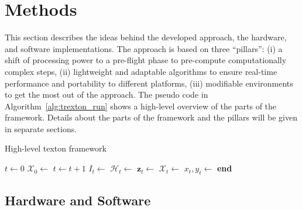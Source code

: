 \documentclass[11pt]{report}
\begin{document}
\chapter{Methods}
\label{chap:methods}

This section describes the ideas behind the developed approach, the
hardware, and software implementations.
The approach is based on three ``pillars'': (i) a shift of processing
power to a pre-flight phase to pre-compute computationally complex
steps, (ii) lightweight and adaptable algorithms to ensure real-time
performance and portability to different platforms, (iii) modifiable
environments to get the most out of the approach. The pseudo code in
Algorithm~\ref{alg:trexton_run} shows a high-level overview of the
parts of the framework. Details about the parts of the framework and
the pillars will be given in separate sections.
\begin{algorithm}
    \caption{High-level texton framework}
    \label{alg:trexton_run}
    \begin{algorithmic}[1]
      \State $t \gets 0$
      \State $\mathcal{X}_0 \gets$ 
      \State $t \gets t+1$ \State
      $I_t \gets$  \State
      $\mathcal{H}_t \gets$ 
      \State $\mathbf{z}_t \gets$
      \State $\mathcal{X}_t \gets$
      \State $x_t, y_t \gets$ 
      \EndWhile
\State \textbf{end}
    \end{algorithmic}
  \end{algorithm}  
\section{Hardware and Software}
\label{sec:hardware}
\end{document}

